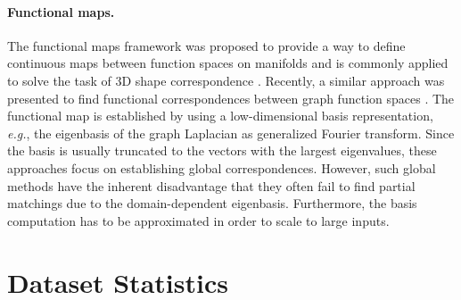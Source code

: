 \documentclass{article}
\def\eg{\emph{e.g.}} \def\Eg{\emph{E.g.}}  \def\ie{\emph{i.e.}} \def\Ie{\emph{I.e.}}  \def\cf{\emph{cf.}}  \def\Cf{\emph{Cf.}}
\begin{document}
\paragraph{Functional maps.}

The functional maps framework was proposed to provide a way to define continuous maps between function spaces on manifolds and is commonly applied to solve the task of 3D shape correspondence \citep{Ovsjanikov/etal/2012,Litany/etal/2017,Rodola/etal/2017,Halimi/etal/2019}.
Recently, a similar approach was presented to find functional correspondences between graph function spaces \citep{Wang/etal/2019b}.
The functional map is established by using a low-dimensional basis representation, \eg, the eigenbasis of the graph Laplacian as generalized Fourier transform.
Since the basis is usually truncated to the  vectors with the largest eigenvalues, these approaches focus on establishing global correspondences.
However, such global methods have the inherent disadvantage that they often fail to find partial matchings due to the domain-dependent eigenbasis.
Furthermore, the basis computation has to be approximated in order to scale to large inputs.

\section{Dataset Statistics}\label{sec:dataset_statistics}
\end{document}
